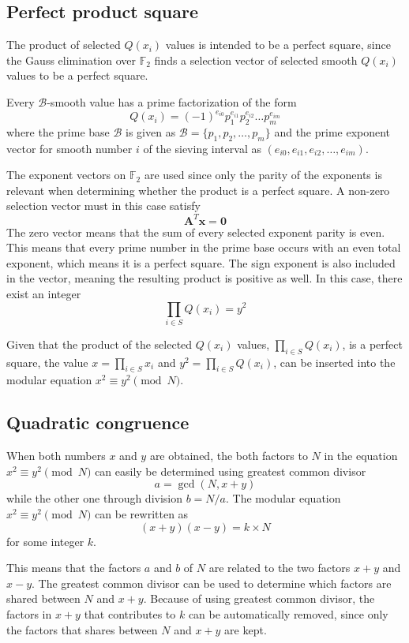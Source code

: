 \documentclass[11pt,a4paper]{article}
\begin{document}
\subsection*{Perfect product square}
The product of selected $Q(x_i)$ values is intended to be a perfect square, since the Gauss elimination over $\mathbb{F}_2$ finds a selection vector of selected smooth $Q(x_i)$ values to be a perfect square. 

Every $\mathcal{B}$-smooth value has a prime  factorization of the form
\[
Q(x_i)=(-1)^{e_{i0}}p_1^{e_{i1}}p_2^{e_{i2}}\ldots p_m^{e_{im}}
\]
where the prime base $\mathcal{B}$ is given as $\mathcal{B} = \{p_1, p_2, \ldots, p_m\}$ and the prime exponent vector for smooth number $i$ of the sieving interval as $(e_{i0}, e_{i1}, e_{i2}, \ldots, e_{im})$.

The exponent vectors on $\mathbb{F}_2$ are used since only the parity of the exponents is relevant when determining whether the product is a perfect square. A non-zero selection vector must in this case satisfy
\[
\mathbf{A}^T\mathbf{x}=\mathbf{0}
\]
The zero vector means that the sum of every selected exponent parity is even. This means that every prime number in the prime base occurs with an even total exponent, which means it is a perfect square. The sign exponent is also included in the vector, meaning the resulting product is positive as well. In this case, there exist an integer
\[
\prod_{i\in S}Q(x_i)=y^2
\]

Given that the product of the selected $Q(x_i)$ values, $\prod_{i\in S} Q(x_i)$, is a perfect square, the value $x=\prod_{i\in S}x_i$ and $y^2=\prod_{i\in S} Q(x_i)$, can be inserted into the modular equation $x^2 \equiv y^2 \pmod N$.

\subsection*{Quadratic congruence}
When both numbers $x$ and $y$ are obtained, the both factors to $N$ in the equation $x^2 \equiv y^2 \pmod N$ can easily be determined using greatest common divisor
\[
a = \gcd(N, x+y)
\]
while the other one through division $b = N/a$. The modular equation $x^2 \equiv y^2 \pmod N$ can be rewritten as
\[
(x+y)(x-y) = k \times N
\]
for some integer $k$.

This means that the factors $a$ and $b$ of $N$ are related to the two factors $x+y$ and $x-y$. The greatest common divisor can be used to determine which factors are shared between $N$ and $x+y$. Because of using greatest common divisor, the factors in $x+y$ that contributes to $k$ can be automatically removed, since only the factors that shares between $N$ and $x+y$ are kept.
\end{document}

